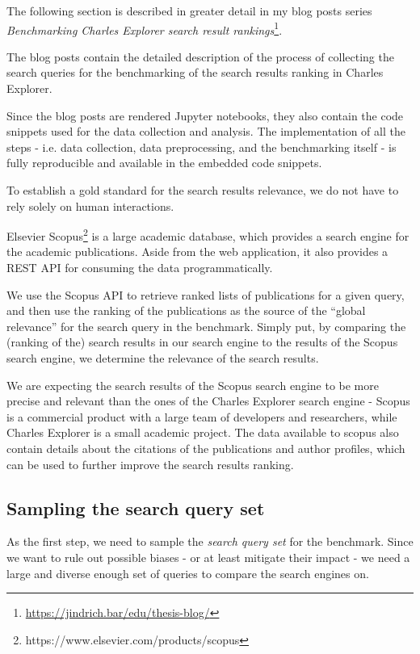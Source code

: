 \begin{mybox}{}
    The following section is described in greater detail in my blog posts series \textit{Benchmarking Charles Explorer search result rankings}\footnote{\url{https://jindrich.bar/edu/thesis-blog/}}.
    
    The blog posts contain the detailed description of the process of collecting the search queries for the benchmarking of the search results ranking in Charles Explorer.

    Since the blog posts are rendered Jupyter notebooks, they also contain the code snippets used for the data collection and analysis.
    The implementation of all the steps - i.e. data collection, data preprocessing, and the benchmarking itself - is fully reproducible and available in the embedded code snippets.
\end{mybox}

To establish a gold standard for the search results relevance, we do not have to rely solely on human interactions.

Elsevier Scopus\footnote{https://www.elsevier.com/products/scopus} is a large academic database, which provides a search engine for the academic publications.
Aside from the web application, it also provides a REST API for consuming the data programmatically.

We use the Scopus API to retrieve ranked lists of publications for a given query, and then use the ranking of the publications as the source of the ``global relevance'' for the search query in the benchmark.
Simply put, by comparing the (ranking of the) search results in our search engine to the results of the Scopus search engine, we determine the relevance of the search results.

We are expecting the search results of the Scopus search engine to be more precise and relevant than the ones of the Charles Explorer search engine -
Scopus is a commercial product with a large team of developers and researchers, while Charles Explorer is a small academic project.
The data available to scopus also contain details about the citations of the publications and author profiles, which can be used to further improve the search results ranking.

\subsection{Sampling the search query set}

As the first step, we need to sample the \textit{search query set} for the benchmark. 
Since we want to rule out possible biases - or at least mitigate their impact - we need a large and diverse enough set of queries to compare the search engines on.

